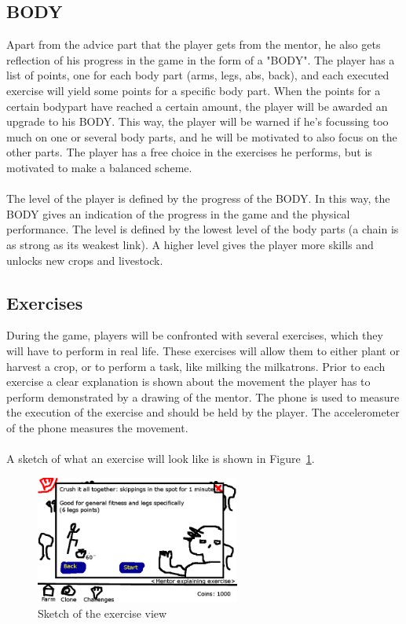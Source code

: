 \documentclass[a4paper,11pt,notitlepage]{report}
\begin{document}
\subsection{BODY}
Apart from the advice part that the player gets from the mentor, he also gets reflection of his progress in the game in the form of a "BODY". The player has a list of points, one for each body part (arms, legs, abs, back), and each executed exercise will yield some points for a specific body part. When the points for a certain bodypart have reached a certain amount, the player will be awarded an upgrade to his BODY. This way, the player will be warned if he's focussing too much on one or several body parts, and he will be motivated to also focus on the other parts. The player has a free choice in the exercises he performs, but is motivated to make a balanced scheme. 
\\\\
The level of the player is defined by the progress of the BODY. In this way, the BODY gives an indication of the progress in the game and the physical performance. The level is defined by the lowest level of the body parts (a chain is as strong as its weakest link). A higher level gives the player more skills and unlocks new crops and livestock.

\subsection{Exercises}
During the game, players will be confronted with several exercises, which they will have to perform in real life. These exercises will allow them to either plant or harvest a crop, or to perform a task, like milking the milkatrons. Prior to each exercise a clear explanation is shown about the movement the player has to perform demonstrated by a drawing of the mentor. The phone is used to measure the execution of the exercise and should be held by the player. The accelerometer of the phone measures the movement.
\\\\
A sketch of what an exercise will look like is shown in Figure~\ref{fig:sketch-exercise}.

\begin{figure}[h]
	\centering
		\includegraphics[width=0.60\textwidth]{Images/sketch-exercise.png}
	\caption{Sketch of the exercise view}
	\label{fig:sketch-exercise}
\end{figure}
\end{document}
